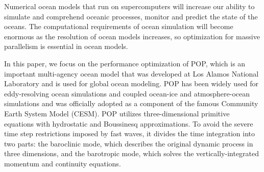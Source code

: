 \documentclass{sig-alternate}
\begin{document}
Numerical ocean models that run on supercomputers will increase our ability to simulate and comprehend oceanic processes, monitor and predict the state of the oceans. The computational requirements of ocean simulation will become enormous as the resolution of ocean models increases, so optimization for massive parallelism is essential in ocean models.

In this paper, we focus on the performance optimization of POP, which is an important multi-agency ocean model that was developed at Los Alamos National Laboratory and is used for global ocean modeling. POP has been widely used for eddy-resolving ocean simulations\cite{mcclean2002eulerian} and coupled ocean-ice and atmosphere-ocean simulations\cite{May2002preliminary} and was officially adopted as a component of the famous Community Earth System Model (CESM). POP utilizes three-dimensional primitive equations with hydrostatic and Boussinesq approximations. To avoid the severe time step restrictions imposed by fast waves, it divides the time integration into two parts: the baroclinic mode, which describes the original dynamic process in three dimensions, and the barotropic mode, which solves the vertically-integrated momentum and continuity equations\cite{smith2010parallel}.
\end{document}
